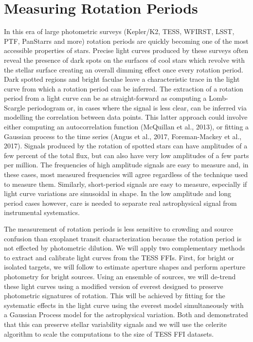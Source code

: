 \documentclass[useAMS, usenatbib, preprint, 12pt]{aastex}
\begin{document}
\section{Measuring Rotation Periods}
In this era of large photometric surveys (Kepler/K2, TESS, WFIRST, LSST, PTF,
PanStarrs and more) rotation periods are quickly becoming one of the most
accessible properties of stars.
Precise light curves produced by these surveys often reveal the presence of
dark spots on the surfaces of cool stars which revolve with the stellar
surface creating an overall dimming effect once every rotation period.
Dark spotted regions and bright faculae leave a characteristic trace in the
light curve from which a rotation period can be inferred.
The extraction of a rotation period from a light curve can be as
straight-forward as computing a Lomb-Scargle periodogram or, in cases where
the signal is less clear, can be inferred via modelling the correlation
between data points.
This latter approach could involve either computing an autocorrelation
function (McQuillan et al., 2013), or fitting a Gaussian process to the time
series (Angus et al., 2017, Foreman-Mackey et al., 2017).
Signals produced by the rotation of spotted stars can have amplitudes of a few
percent of the total flux, but can also have very low amplitudes of a few
parts per million.
The frequencies of high amplitude signals are easy to measure and, in these
cases, most measured frequencies will agree regardless of the technique used
to measure them.
Similarly, short-period signals are easy to measure, especially if light curve
variations are sinusoidal in shape.
In the low amplitude and long period cases however, care is needed to separate
real astrophysical signal from instrumental systematics.

The measurement of rotation periods is less sensitive to crowding and source
confusion than exoplanet transit characterization because the rotation period
is not effected by photometric dilution.
We will apply two complementary methods to extract and calibrate light curves
from the TESS FFIs.
First, for bright or isolated targets, we will follow \citet{montet2017} to
estimate aperture shapes and perform aperture photometry for bright sources.
Using an ensemble of sources, we will de-trend these light curves using a
modified version of \textsf{everest} \citep{luger2016, luger2017} designed to
preserve photometric signatures of rotation.
This will be achieved by fitting for the systematic effects in the light curve
using the \textsf{everest} model simultaneously with a Gaussian Process model
for the astrophysical variation.
Both \citet{aigrain2016} and \citet{luger2016} demonstrated that this can
preserve stellar variability signals and we will use the \textsf{celerite}
algorithm \citep{dfm2017} to scale the computations to the size of TESS FFI
datasets.
\end{document}
